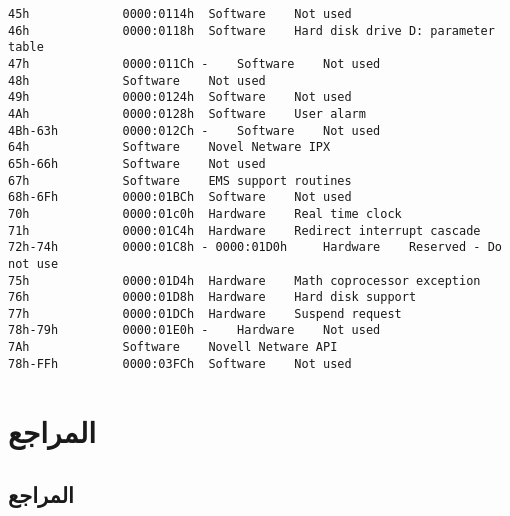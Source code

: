 \documentclass[document.tex]{subfiles}
\begin{document}
\begin{english}
\begin{lstlisting}[label=lst:bootloader_hex,caption=Some Code]
45h 			0000:0114h 	Software 	Not used
46h 			0000:0118h 	Software 	Hard disk drive D: parameter table
47h 			0000:011Ch - 	Software 	Not used
48h 	  		Software 	Not used
49h 			0000:0124h 	Software 	Not used
4Ah 			0000:0128h 	Software 	User alarm
4Bh-63h 		0000:012Ch - 	Software 	Not used
64h 	  		Software 	Novel Netware IPX
65h-66h 	  	Software 	Not used
67h 	  		Software 	EMS support routines
68h-6Fh 		0000:01BCh 	Software 	Not used
70h 			0000:01c0h 	Hardware 	Real time clock
71h 			0000:01C4h 	Hardware 	Redirect interrupt cascade
72h-74h 		0000:01C8h - 0000:01D0h 	Hardware 	Reserved - Do not use
75h 			0000:01D4h 	Hardware 	Math coprocessor exception
76h 			0000:01D8h 	Hardware 	Hard disk support
77h 			0000:01DCh 	Hardware 	Suspend request
78h-79h 		0000:01E0h - 	Hardware 	Not used
7Ah 	  		Software 	Novell Netware API
78h-FFh 		0000:03FCh 	Software 	Not used

\end{lstlisting}
\end{english}

\chapter{المراجع}

\section{المراجع}
\end{document}
